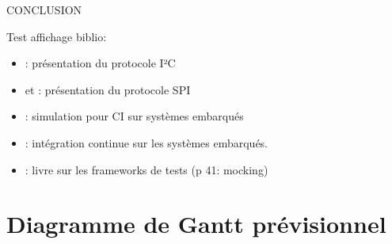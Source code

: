 \documentclass[a4paper]{article}
\begin{document}
CONCLUSION



Test affichage biblio:

\begin{itemize}
  \item \cite{mankar2014review}: présentation du protocole I²C
  \item \cite{dhaker2018introduction} et \cite{li2014design}: présentation du
    protocole SPI
  \item \cite{engblom2015continuous}: simulation pour CI sur systèmes embarqués
  \item \cite{maartensson2016continuous}: intégration continue sur les systèmes
    embarqués.
  \item \cite{hamill2004unit}: livre sur les frameworks de tests (p 41: mocking)
\end{itemize}

\clearpage{}
\pagestyle{empty}
\printbibliography[keyword={paper},title={Biliographie}]
\printbibliography[keyword={web},title={Webographie}]

\clearpage
\printglossaries

\appendix

\clearpage{}
\section{Diagramme de Gantt prévisionnel}\label{appendix:expectedgantt}

\clearpage{}
\end{document}
